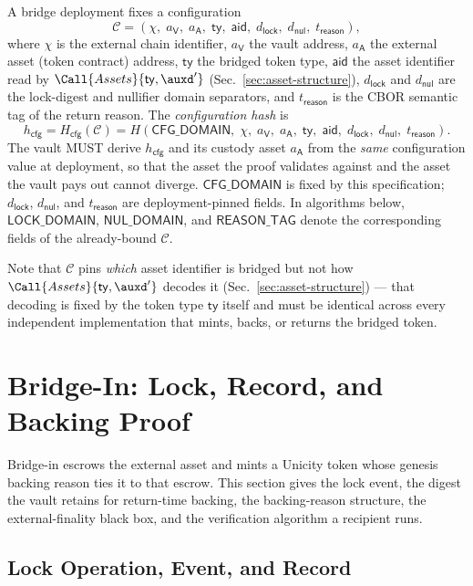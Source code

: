 A bridge deployment fixes a configuration
\[
\mathcal{C} = (\chi,\; a_\mathsf{V},\; a_\mathsf{A},\; \mathsf{ty},\; \mathsf{aid},\; d_\mathsf{lock},\; d_\mathsf{nul},\; t_\mathsf{reason}),
\]
where $\chi$ is the external chain identifier, $a_\mathsf{V}$ the vault address, $a_\mathsf{A}$ the external asset (token contract) address, $\mathsf{ty}$ the bridged token type, $\mathsf{aid}$ the asset identifier read by $\Call{Assets}{\mathsf{ty},\auxd'}$ (Sec.~\ref{sec:asset-structure}), $d_\mathsf{lock}$ and $d_\mathsf{nul}$ are the lock-digest and nullifier domain separators, and $t_\mathsf{reason}$ is the CBOR semantic tag of the return reason. The \emph{configuration hash} is
\[
h_\mathsf{cfg} = H_\mathsf{cfg}(\mathcal{C})
= H(\mathsf{CFG\_DOMAIN},\; \chi,\; a_\mathsf{V},\; a_\mathsf{A},\; \mathsf{ty},\; \mathsf{aid},\; d_\mathsf{lock},\; d_\mathsf{nul},\; t_\mathsf{reason}).
\]
The vault MUST derive $h_\mathsf{cfg}$ and its custody asset $a_\mathsf{A}$ from the \emph{same} configuration value at deployment, so that the asset the proof validates against and the asset the vault pays out cannot diverge. $\mathsf{CFG\_DOMAIN}$ is fixed by this specification; $d_\mathsf{lock}$, $d_\mathsf{nul}$, and $t_\mathsf{reason}$ are deployment-pinned fields. In algorithms below, $\mathsf{LOCK\_DOMAIN}$, $\mathsf{NUL\_DOMAIN}$, and $\mathsf{REASON\_TAG}$ denote the corresponding fields of the already-bound $\mathcal{C}$.

Note that $\mathcal{C}$ pins \emph{which} asset identifier is bridged but not how $\Call{Assets}{\mathsf{ty},\auxd'}$ decodes it (Sec.~\ref{sec:asset-structure}) --- that decoding is fixed by the token type $\mathsf{ty}$ itself and must be identical across every independent implementation that mints, backs, or returns the bridged token.

\section{Bridge-In: Lock, Record, and Backing Proof}\label{app:bridging-lock}

Bridge-in escrows the external asset and mints a Unicity token whose genesis backing reason ties it to that escrow. This section gives the lock event, the digest the vault retains for return-time backing, the backing-reason structure, the external-finality black box, and the verification algorithm a recipient runs.

\subsection{Lock Operation, Event, and Record}\label{app:bridging-lock-op}

